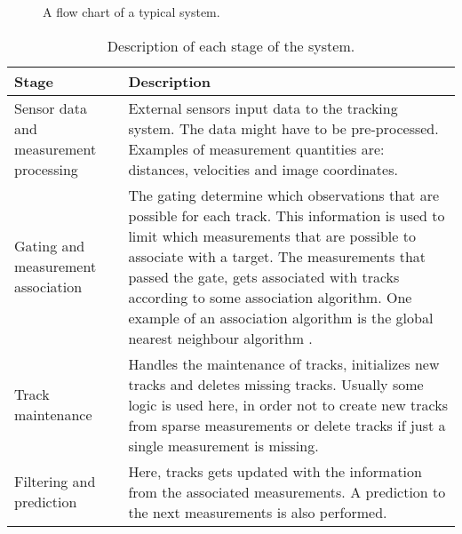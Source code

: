 \begin{figure}[!ht]
	\centering
	\caption{\label{fig:trackingflowchart} A flow chart of a typical \abbrMTT system.}
\end{figure}

\begin{table}[!ht]
	\centering
	\caption{\label{tab:trackingflowchart} Description of each stage of the \abbrMTT system.}
	\begin{tabular}{|>{\centering\arraybackslash}p{4cm}|p{8cm}|}
		\hline
		\textbf{Stage} & \textbf{Description} \\
		\hline
		Sensor data and measurement processing & External sensors input data to the tracking system. The data might have to be pre-processed. Examples of measurement quantities are: distances, velocities and image coordinates. \\
		\hline
		Gating and measurement association & The gating determine which observations that are possible for each track. This information is used to limit which measurements that are possible to associate with a target. The measurements that passed the gate, gets associated with tracks according to some association algorithm. One example of an association algorithm is the global nearest neighbour algorithm \cite{Blackman:1999}. \\
		\hline
		Track maintenance & Handles the maintenance of tracks, initializes new tracks and deletes missing tracks. Usually some logic is used here, in order not to create new tracks from sparse measurements or delete tracks if just a single measurement is missing. \\
		\hline
		Filtering and prediction & Here, tracks gets updated with the information from the associated measurements. A prediction to the next measurements is also performed. \\
		\hline
	\end{tabular}
\end{table}

